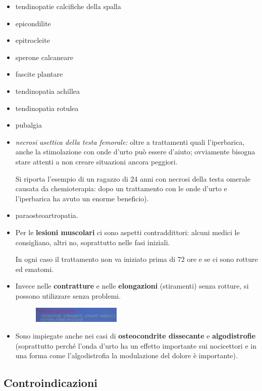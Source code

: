 \begin{itemize}
\item
  tendinopatie calcifiche della spalla
\item
  epicondilite
\item
  epitrocleite
\item
  sperone calcaneare
\item
  fascite plantare
\item
  tendinopatia achillea
\item
  tendinopatia rotulea
\item
  pubalgia
\item
  \emph{necrosi asettica della testa femorale:} oltre a trattamenti
  quali l'iperbarica, anche la stimolazione con onde d'urto può essere
  d'aiuto; ovviamente bisogna stare attenti a non creare situazioni
  ancora peggiori.

Si riporta l'esempio di un ragazzo di 24 anni con necrosi della testa
omerale causata da chemioterapia: dopo un trattamento con le onde d'urto
e l'iperbarica ha avuto un enorme beneficio).

\item
  paraosteoartropatia.
\item
  Per le \textbf{lesioni muscolari} ci sono aspetti contraddittori:
  alcuni medici le consigliano, altri no, soprattutto nelle fasi
  iniziali.

In ogni caso il trattamento non va iniziato prima di 72 ore e se ci sono
rotture ed ematomi.

\item
  Invece nelle \textbf{contratture} e nelle \textbf{elongazioni}
  (stiramenti) senza rotture, si possono utilizzare senza problemi.

\begin{figure}[!ht]
\centering
\includegraphics[width=0.4\textwidth]{025/image21.jpeg}
\end{figure}

\item
  Sono impiegate anche nei casi di \textbf{osteocondrite dissecante} e
  \textbf{algodistrofie} (soprattutto perché l'onda d'urto ha un effetto
  importante sui nocicettori e in una forma come l'algodistrofia la
  modulazione del dolore è importante).
\end{itemize}

\subsection{Controindicazioni}

